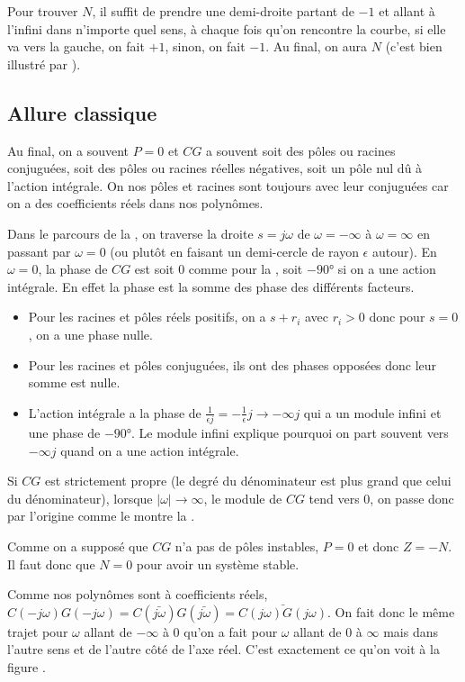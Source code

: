Pour trouver $N$, il suffit de prendre une demi-droite partant de $-1$ et
allant à l'infini dans n'importe quel sens, à chaque fois qu'on rencontre
la courbe, si elle va vers la gauche, on fait $+1$, sinon, on fait $-1$.
Au final, on aura $N$ (c'est bien illustré par \cite{cheever2013nyquist}).

\subsection{Allure classique}
Au final, on a souvent $P = 0$ et $CG$ a souvent soit des pôles ou racines
conjuguées, soit des pôles ou racines réelles négatives, soit un pôle
nul dû à l'action intégrale.
On nos pôles et racines sont toujours avec leur conjuguées car on a des coefficients
réels dans nos polynômes.

Dans le parcours de la , on traverse la droite
$s = j\omega$ de $\omega = -\infty$ à $\omega = \infty$ en passant par $\omega = 0$
(ou plutôt en faisant un demi-cercle de rayon $\epsilon$ autour).
En $\omega = 0$, la phase de $CG$ est soit 0 comme pour la ,
  soit $-\ang{90}$ si on a une action
intégrale.
En effet la phase est la somme des phase des différents facteurs.
\begin{itemize}
  \item
    Pour les racines et pôles réels positifs, on a $s + r_i$ avec $r_i > 0$ donc
    pour $s = 0$, on a une phase nulle.
  \item
    Pour les racines et pôles conjuguées, ils ont des phases opposées donc leur somme
    est nulle.
  \item
    L'action intégrale a la phase de $\frac{1}{\epsilon j} = -\frac{1}{\epsilon} j \to -\infty j$
    qui a un module infini et une phase de $-\ang{90}$.
    Le module infini explique pourquoi on part souvent vers $-\infty j$ quand on a une action
    intégrale.
\end{itemize}

Si $CG$ est strictement propre (le degré du dénominateur est plus grand que celui du dénominateur),
lorsque $|\omega| \to \infty$, le module de $CG$ tend vers 0, on passe donc par l'origine comme
le montre la .

Comme on a supposé que $CG$ n'a pas de pôles instables, $P = 0$ et donc $Z = -N$.
Il faut donc que $N = 0$ pour avoir un système stable.

Comme nos polynômes sont à coefficients réels,
$C(-j\omega)G(-j\omega) = C(\bar{j\omega})G(\bar{j\omega}) = \bar{C(j\omega)G(j\omega)}$.
On fait donc le même trajet pour $\omega$ allant de $-\infty$ à $0$ qu'on a fait
pour $\omega$ allant de $0$ à $\infty$ mais dans l'autre sens et de l'autre côté de l'axe réel.
C'est exactement ce qu'on voit à la figure .

